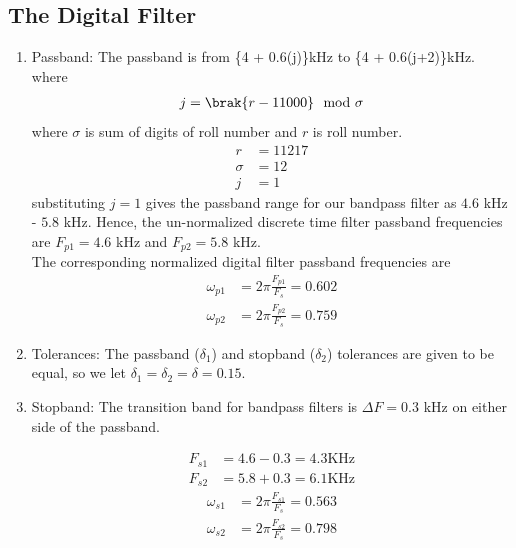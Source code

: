\documentclass{article}
\begin{document}
\subsection{The Digital Filter}
\begin{enumerate}
    \item {Passband:}
          The passband is from \{4 + 0.6(j)\}kHz to \{4 + 0.6(j+2)\}kHz. \\
          where 
          \begin{align}
              j=\brak{r-11000} \mod \sigma
          \end{align}
          where $\sigma$ is sum of digits of roll number and $r$ is roll number.\\
          \begin{align}
              r      & =11217 \\
              \sigma & = 12   \\
              j      & =1
          \end{align}
          substituting $j =1$ gives the passband
          range for our bandpass filter as $4.6$ kHz - $5.8$ kHz.  Hence, the un-normalized discrete time filter
          passband frequencies are $F_{p1} = 4.6$ kHz
          and $F_{p2} = 5.8$ kHz. \\
          The corresponding normalized digital filter passband frequencies are
          \begin{align}
              \omega_{p1} & = 2\pi\frac{F_{p1}}{F_s} = 0.602  \\
              \omega_{p2} & = 2\pi\frac{F_{p2}}{F_s}  = 0.759
          \end{align}
          
    \item {Tolerances:}  The passband ($\delta_1$) and stopband ($\delta_2$) tolerances are given to
          be equal, so we let $\delta_1 = \delta_2 = \delta = 0.15$.
          
    \item { Stopband:}  The {transition band} for bandpass filters is $\Delta F = 0.3$ kHz on either side of the passband.
          
          \begin{align}
              F_{s1} & = 4.6-0.3 = 4.3 \text{KHz}  \\
              F	_{s2} & = 5.8+0.3 = 6.1 \text{KHz}
          \end{align}
          \begin{align}
              \omega_{s1} & = 2\pi\frac{F_{s1}}{F_s} = 0.563 \\
              \omega_{s2} & = 2\pi\frac{F_{s2}}{F_s} = 0.798 \\
          \end{align}
\end{enumerate}
\end{document}
